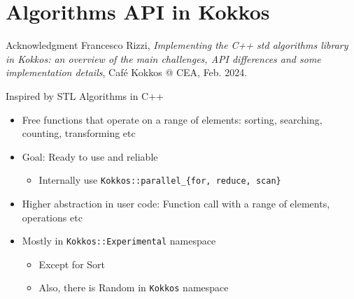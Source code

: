 \documentclass[
    aspectratio=169,
    \createHandout
]{beamer}
\begin{document}

\section{Algorithms API in Kokkos}

\begin{frame}[fragile]{Acknowledgment}
    Francesco Rizzi, \emph{Implementing the C++ std algorithms library in
    Kokkos: an overview of the main challenges, API differences and
    some implementation details}, Café Kokkos @ CEA, Feb. 2024.
\end{frame}

\begin{frame}[fragile]{Inspired by STL Algorithms in C++}
    \begin{itemize}
        \item Free functions that operate on a range of elements:
        sorting, searching, counting, transforming etc
        \item Goal: Ready to use and reliable
        \begin{itemize}
            \item Internally use \texttt{Kokkos::parallel\_\{for, reduce, scan\}}
        \end{itemize}
        \item Higher abstraction in user code: Function call with a range of elements, operations etc
        \item Mostly in \texttt{Kokkos::Experimental} namespace
        \begin{itemize}
            \item Except for Sort
            \item Also, there is Random in \texttt{Kokkos} namespace
        \end{itemize}
    \end{itemize}
\end{frame}
\end{document}
